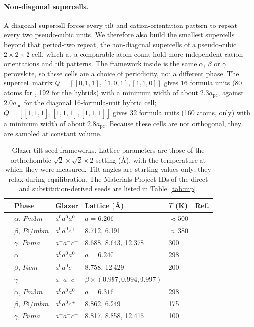 \paragraph{Non-diagonal supercells.} A diagonal supercell forces every tilt and cation-orientation
pattern to repeat every two pseudo-cubic units. We therefore also build the smallest supercells
beyond that period-two repeat, the non-diagonal supercells of a pseudo-cubic $2\times2\times2$
cell,\cite{LloydWilliams2015PRB} which at a comparable atom count hold more independent cation
orientations and tilt patterns. The framework inside is the same $\alpha$, $\beta$ or $\gamma$
perovskite, so these cells are a choice of periodicity, not a different phase. The supercell matrix
$Q=[[0,1,1],[1,0,1],[1,1,0]]$ gives 16 formula units (80 atoms for \CsSnI{}, 192 for the hybrids)
with a minimum width of about $2.3a_\mathrm{pc}$, against $2.0a_\mathrm{pc}$ for the diagonal
16-formula-unit hybrid cell; $Q=[[\bar1,1,1],[1,\bar1,1],[1,1,\bar1]]$ gives 32 formula units
(160 atoms, \CsSnI{} only) with a minimum width of about $2.8a_\mathrm{pc}$. Because these cells are
not orthogonal, they are sampled at constant volume.

\begin{table}[tb]
\caption{Glazer-tilt seed frameworks. Lattice parameters are those of the orthorhombic
$\sqrt{2}\times\sqrt{2}\times2$ setting (\si{\angstrom}), with the temperature at which they were
measured. Tilt angles are starting values only; they relax during equilibration. The Materials
Project IDs of the direct and substitution-derived seeds are listed in Table~\ref{tab:mp}.}
\label{tab:seeds}
\begin{tabular}{llllll}
\toprule
 & Phase & Glazer & Lattice (\si{\angstrom}) & $T$ (K) & Ref. \\
\midrule
\CsSnI{} & $\alpha$, $Pm\bar{3}m$ & $a^0a^0a^0$ & $a=6.206$ & $\approx500$ & \cite{Chung2012JACS} \\
 & $\beta$, $P4/mbm$ & $a^0a^0c^+$ & 8.712, 6.191 & $\approx380$ & \cite{Chung2012JACS} \\
 & $\gamma$, $Pnma$ & $a^-a^-c^+$ & 8.688, 8.643, 12.378 & 300 & \cite{Chung2012JACS} \\
\MASnI{} & $\alpha$ & $a^0a^0a^0$ & $a=6.240$ & 298 & \cite{Mitzi1995JSSC} \\
 & $\beta$, $I4cm$ & $a^0a^0c^-$ & 8.758, 12.429 & 200 & \cite{stoumpos2013semiconducting} \\
 & $\gamma$ & $a^-a^-c^+$ & $\beta\times(0.997,0.994,0.997)$ & -- & -- \\
\FASnI{} & $\alpha$, $Pm\bar{3}m$ & $a^0a^0a^0$ & $a=6.316$ & 298 & \cite{schueller2018crystal} \\
 & $\beta$, $P4/mbm$ & $a^0a^0c^+$ & 8.862, 6.249 & 175 & \cite{schueller2018crystal} \\
 & $\gamma$, $Pnma$ & $a^-a^-c^+$ & 8.817, 8.858, 12.416 & 100 & \cite{schueller2018crystal} \\
\bottomrule
\end{tabular}
\end{table}

